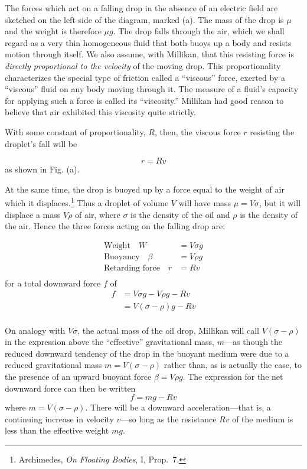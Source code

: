 The forces which act on a falling drop in the absence of an electric
field are sketched on the left side of the diagram, marked (a). The mass 
of the drop is $\mu$ and the weight is therefore $\mu g$. The drop falls 
through the air, which we shall regard as a very thin homogeneous fluid that 
both buoys up a body and resists motion through itself. We also assume, with 
Millikan, that this resisting force is \emph{directly proportional to the 
velocity} of the moving drop. This proportionality characterizes the special 
type of friction called a ``viscous'' force, exerted by a ``viscous'' fluid 
on any body moving through it. The measure of a fluid's capacity for
applying such a force is called its ``viscosity.'' Millikan had good
reason to believe that air exhibited this viscosity quite strictly.

With some constant of proportionality, $R$, then, the viscous force
$r$ resisting the droplet's fall will be

\begin{equation*}\tag{3.1}
r = Rv \label{eq:millikan_3.1}
\end{equation*}
%
as shown in Fig. (a).

At the same time, the drop is buoyed up by a force equal to the weight
of air which it displaces.\footnote{Archimedes, \emph{On Floating
  Bodies}, I, Prop.\ 7.} Thus a droplet of volume $V$ will have mass
$\mu = V\sigma$, but it will displace a mass $V\rho$ of air,
where $\sigma$ is the density of the oil and $\rho$ is the density of
the air. Hence the three forces acting on the falling drop are:

\begin{align*}
\text{Weight}\quad W & = V\sigma g\\
\text{Buoyancy}\quad \beta & = V\rho g\\
\text{Retarding force}\quad r &= Rv\\
\end{align*}
%
for a total downward force $f$ of
%
\begin{align*}
f &= V\sigma g-V\rho g-Rv\\
 &= V(\sigma-\rho)g-Rv\\
\end{align*}

On analogy with $V\sigma$, the actual mass of the oil drop, Millikan
will call $V(\sigma-\rho)$ in the expression above the
``effective'' grav\-i\-ta\-tion\-al mass, $m$---as though the reduced
downward tendency of the drop in the buoyant medium were due to a
reduced grav\-i\-ta\-tion\-al mass $m = V(\sigma-\rho)$
rather than, as is actually the case, to the presence of an upward
buoyant force $\beta = V\rho g$. The expression for the net downward
force can then be written
\begin{equation*}\tag{3.2}
f = mg - Rv \label{eq:millikan_3.2}
\end{equation*}
where $m = V(\sigma-\rho)$. There will be a downward
acceleration---that is, a continuing increase in velocity $v$---so
long as the resistance $Rv$ of the medium is less than the
effective weight $mg$.

